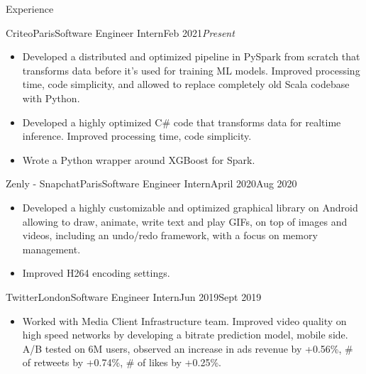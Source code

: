 \documentclass{resume}
\begin{document}
	\begin{rSection}{Experience}
        \begin{job}{Criteo}{Paris}{Software Engineer Intern}{Feb 2021}{\em{Present}}{
            \begin{itemize}
                \item Developed a distributed and optimized pipeline in PySpark from scratch that transforms data before it's used for training ML models. Improved processing time, code simplicity, and allowed to replace completely old Scala codebase with Python.
                \item Developed a highly optimized C\# code that transforms data for realtime inference. Improved processing time, code simplicity.
                \item Wrote a Python wrapper around XGBoost for Spark.
            \end{itemize}
        }
        \end{job}

        \begin{job}{Zenly - Snapchat}{Paris}{Software Engineer Intern}{April 2020}{Aug 2020}{
            \begin{itemize}
                \item Developed a highly customizable and optimized graphical library on Android allowing to draw, animate, write text and play GIFs, on top of images and videos, including an undo/redo framework, with a focus on memory management.
                \item Improved H264 encoding settings.
            \end{itemize}
        }
        \end{job}

        \begin{job}{Twitter}{London}{Software Engineer Intern}{Jun 2019}{Sept 2019}{
            \begin{itemize}
                \item Worked with Media Client Infrastructure team. Improved video quality on high speed networks by developing a bitrate prediction model, mobile side. A/B tested on 6M users, observed an increase in ads revenue by +0.56\%, \# of retweets by +0.74\%, \# of likes by +0.25\%.
            \end{itemize}
        }
        \end{job}


\end{rSection}
\end{document}
